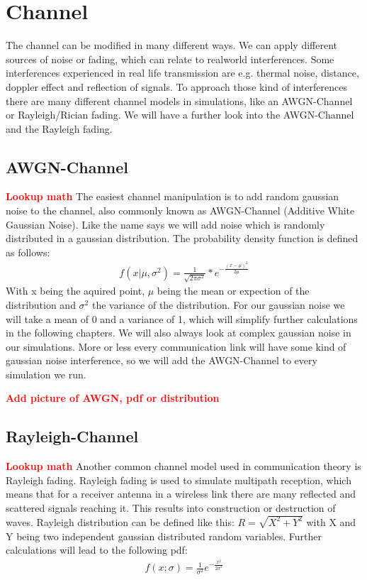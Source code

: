 \documentclass[12pt,oneside, reqno]{report}
\newcommand\boldred[1]{\textcolor{red}{\textbf{#1}}}
\begin{document}
\section{Channel}
The channel can be modified in many different ways. We can apply different sources of noise or fading, which can relate to realworld interferences. Some interferences experienced in real life transmission are e.g. thermal noise, distance, doppler effect and reflection of signals. To approach those kind of interferences there are many different channel models in simulations, like an AWGN-Channel or Rayleigh/Rician fading. We will have a further look into the AWGN-Channel and the Rayleigh fading.

\subsection{AWGN-Channel}
\boldred{Lookup math}
The easiest channel manipulation is to add random gaussian noise to the channel, also commonly known as AWGN-Channel (Additive White Gaussian Noise). Like the name says we will add noise which is randomly distributed in a gaussian distribution. The probability density function is defined as follows:
\begin{gather*}
f(x|\mu,\sigma^2) = \frac{1}{\sqrt{2\pi\sigma^2}}*e^{-\frac{(x-\mu)^2}{2\mu}}
\end{gather*}
With x being the aquired point, $\mu$ being the mean or expection of the distribution and $\sigma^2$ the variance of the distribution. For our gaussian noise we will take a mean of 0 and a variance of 1, which will simplify further calculations in the following chapters. We will also always look at complex gaussian noise in our simulations. More or less every communication link will have some kind of gaussian noise interference, so we will add the AWGN-Channel to every simulation we run.

\boldred{Add picture of AWGN, pdf or distribution}

\subsection{Rayleigh-Channel}
\boldred{Lookup math}
Another common channel model used in communication theory is Rayleigh fading. Rayleigh fading is used to simulate multipath reception, which means that for a receiver antenna in a wireless link there are many reflected and scattered signals reaching it. This results into construction or destruction of waves. Rayleigh distribution can be defined like this: $R = \sqrt{X^2 + Y^2}$ with X and Y being two independent gaussian distributed random variables. Further calculations will lead to the following pdf:
\begin{gather*}
f(x;\sigma) = \frac{1}{\sigma^2}e^{-\frac{x^2}{2\sigma^2}} 
\end{gather*} 
\end{document}
